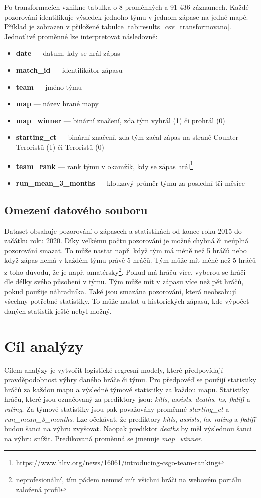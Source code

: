 Po transformacích vznikne tabulka o 8 proměnných a 91 436 záznamech. Každé pozorování identifikuje výsledek jednoho týmu v jednom zápase
na jedné mapě. Příklad je zobrazen v přiložené tabulce \ref{tab:results_csv_transformovano}. Jednotlivé proměnné lze interpretovat následovně:
\begin{itemize}
    \item \textbf{date} --- datum, kdy se hrál zápas
    \item \textbf{match\_id} --- identifikátor zápasu
    \item \textbf{team} --- jméno týmu
    \item \textbf{map} --- název hrané mapy
    \item \textbf{map\_winner} --- binární značení, zda tým vyhrál (1) či prohrál (0)
    \item \textbf{starting\_ct} --- binární značení, zda tým začal zápas na straně Counter-Teroristů (1) či Teroristů (0)
    \item \textbf{team\_rank} --- rank týmu v okamžik, kdy se zápas hrál\footnote{\url{https://www.hltv.org/news/16061/introducing-csgo-team-ranking}}
    \item \textbf{run\_mean\_3\_months} --- klouzavý průměr týmu za poslední tři měsíce
\end{itemize}

\subsection{Omezení datového souboru}
Dataset obsahuje pozorování o zápasech a statistikách od konce roku 2015 do začátku roku 2020. Díky velkému počtu pozorování je možné chybná či neúplná pozorování
smazat. To může nastat např. když tým má méně než 5 hráčů nebo když zápas nemá v každém týmu právě 5 hráčů. Tým může mít méně než 5 hráčů z toho důvodu, že je např.
amatérsky\footnote{neprofesionální, tím pádem nemusí mít všichni hráči na webovém portálu založená profil}. Pokud má hráčů více, vyberou se hráči dle délky svého působení v týmu.
Tým může mít v zápasu více než pět hráčů, pokud použije náhradníka. Také jsou smazána pozorování, která neobsahují všechny potřebné statistiky. To může nastat u historických
zápasů, kde výpočet daných statistik ještě nebyl možný.


\newpage
\section{Cíl analýzy}
Cílem analýzy je vytvořit logistické regresní modely, které předpovídají pravděpodobnost výhry daného hráče či týmu. Pro předpověď se použijí statistiky hráčů
za každou mapu a výsledné týmové statistiky za každou mapu. Statistiky hráčů, které jsou označovaný za prediktory jsou: \textit{kills}, \textit{assists}, \textit{deaths},
\textit{hs}, \textit{fkdiff} a \textit{rating}. Za týmové statistiky jsou pak považovány proměnné \textit{starting\_ct} a \textit{run\_mean\_3\_months}. Lze očekávat, že
prediktory \textit{kills}, \textit{assists}, \textit{hs}, \textit{rating} a \textit{fkdiff} budou šanci na výhru zvyšovat. Naopak prediktor \textit{deaths} by měl
výslednou šanci na výhru snížit. Predikovaná proměnná se jmenuje \textit{map\_winner}.

